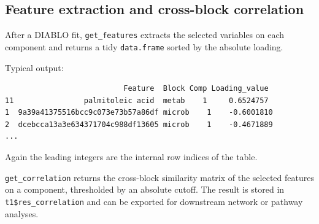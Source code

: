 \documentclass[
]{book}
\newenvironment{Shaded}{\begin{snugshade}}{\end{snugshade}}
\newcommand{\AttributeTok}[1]{\textcolor[rgb]{0.13,0.29,0.53}{#1}}
\newcommand{\CommentTok}[1]{\textcolor[rgb]{0.56,0.35,0.01}{\textit{#1}}}
\newcommand{\DecValTok}[1]{\textcolor[rgb]{0.00,0.00,0.81}{#1}}
\newcommand{\FloatTok}[1]{\textcolor[rgb]{0.00,0.00,0.81}{#1}}
\newcommand{\FunctionTok}[1]{\textcolor[rgb]{0.13,0.29,0.53}{\textbf{#1}}}
\newcommand{\NormalTok}[1]{#1}
\newcommand{\OtherTok}[1]{\textcolor[rgb]{0.56,0.35,0.01}{#1}}
\newcommand{\SpecialCharTok}[1]{\textcolor[rgb]{0.81,0.36,0.00}{\textbf{#1}}}
\begin{document}
\subsection{Feature extraction and cross-block correlation}\label{feature-extraction-and-cross-block-correlation}

After a DIABLO fit, \texttt{get\_features} extracts the selected variables on each component and returns a tidy \texttt{data.frame} sorted by the absolute loading.

\begin{Shaded}
\end{Shaded}

Typical output:

\begin{verbatim}
                           Feature  Block Comp Loading_value
11                palmitoleic acid  metab    1     0.6524757
1  9a39a41375516bcc9c073e73b57a86df microb    1    -0.6001810
2  dcebcca13a3e634371704c988df13605 microb    1    -0.4671889
...
\end{verbatim}

Again the leading integers are the internal row indices of the table.

\texttt{get\_correlation} returns the cross-block similarity matrix of the selected features on a component, thresholded by an absolute cutoff.
The result is stored in \texttt{t1\$res\_correlation} and can be exported for downstream network or pathway analyses.

\begin{Shaded}
\end{Shaded}
\end{document}
